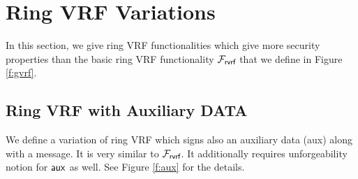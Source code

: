 \section{Ring VRF Variations}

In this section, we give ring VRF functionalities which give more security properties than the basic ring VRF functionality $ \mathcal{F}_{\textsf{rvrf}} $ that we define in Figure \ref{f:gvrf}.

\newcommand{\faux}{\fgvrf^{\mathsf{aux}}}
\subsection{Ring VRF with Auxiliary DATA}
We define a variation of ring VRF which signs also an auxiliary data (aux) along with a message. It is very similar to $ \mathcal{F}_{\textsf{rvrf}} $. It additionally requires unforgeability notion for $ \mathsf{aux} $ as well. See Figure \ref{f:aux} for the details.
